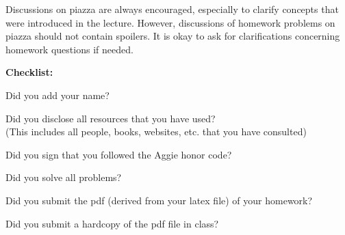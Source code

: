 \documentclass{article}
\theoremstyle{definition}
\newcommand{\checklist}{\noindent\textbf{Checklist:}
\begin{compactitem}[$\Box$] 
\item Did you add your name? 
\item Did you disclose all resources that you have used? \\
(This includes all people, books, websites, etc. that you have consulted)
\item Did you sign that you followed the Aggie honor code? 
\item Did you solve all problems? 
\item Did you submit the pdf (derived from your latex file)
  of your homework?
\item Did you submit a hardcopy of the pdf file in class? 
\end{compactitem}
}
\begin{document}
Discussions on piazza are always encouraged, especially to clarify
concepts that were introduced in the lecture. However, discussions of
homework problems on piazza should not contain spoilers. It is okay to
ask for clarifications concerning homework questions if needed. 
\medskip



\goodbreak
\checklist
\end{document}
